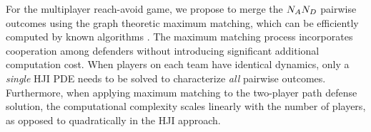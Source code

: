 For the multiplayer reach-avoid game, we propose to merge the $N_AN_D$ pairwise outcomes using the graph theoretic maximum matching, which can be efficiently computed by known algorithms \cite{Schrjiver2004, Karpinski1998}. The maximum matching process incorporates cooperation among defenders without introducing significant additional computation cost. When players on each team have identical dynamics, only a \textit{single} HJI PDE needs to be solved to characterize \textit{all} pairwise outcomes. Furthermore, when applying maximum matching to the two-player path defense solution, the computational complexity scales linearly with the number of players, as opposed to quadratically in the HJI approach.